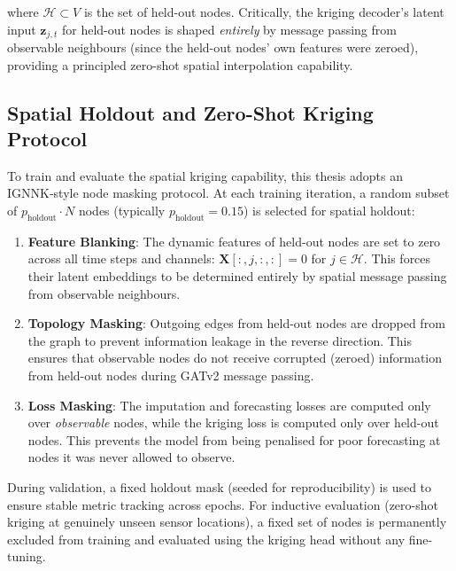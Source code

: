 \noindent where $\mathcal{H} \subset V$ is the set of held-out nodes. Critically, the kriging decoder's latent input $\mathbf{z}_{j,t}$ for held-out nodes is shaped \emph{entirely} by message passing from observable neighbours (since the held-out nodes' own features were zeroed), providing a principled zero-shot spatial interpolation capability.

\subsection{Spatial Holdout and Zero-Shot Kriging Protocol}
\label{subsec:meth-spatial-holdout}

To train and evaluate the spatial kriging capability, this thesis adopts an IGNNK-style node masking protocol. At each training iteration, a random subset of $p_{\text{holdout}} \cdot N$ nodes (typically $p_{\text{holdout}} = 0.15$) is selected for spatial holdout:

\begin{enumerate}
    \item \textbf{Feature Blanking}: The dynamic features of held-out nodes are set to zero across all time steps and channels: $\mathbf{X}[:, j, :, :] = 0$ for $j \in \mathcal{H}$. This forces their latent embeddings to be determined entirely by spatial message passing from observable neighbours.
    \item \textbf{Topology Masking}: Outgoing edges from held-out nodes are dropped from the graph to prevent information leakage in the reverse direction. This ensures that observable nodes do not receive corrupted (zeroed) information from held-out nodes during GATv2 message passing.
    \item \textbf{Loss Masking}: The imputation and forecasting losses are computed only over \emph{observable} nodes, while the kriging loss is computed only over held-out nodes. This prevents the model from being penalised for poor forecasting at nodes it was never allowed to observe.
\end{enumerate}

\noindent During validation, a fixed holdout mask (seeded for reproducibility) is used to ensure stable metric tracking across epochs. For inductive evaluation (zero-shot kriging at genuinely unseen sensor locations), a fixed set of nodes is permanently excluded from training and evaluated using the kriging head without any fine-tuning.

